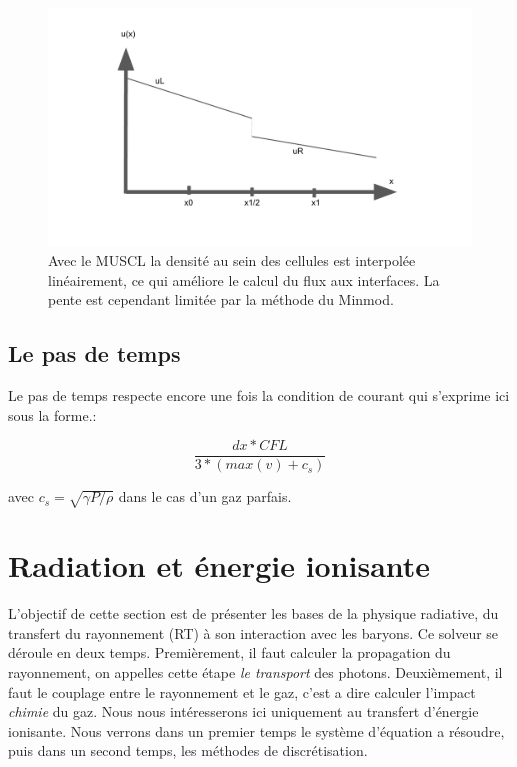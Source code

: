 \begin{figure}
        \includegraphics[width=.95\linewidth]{img/02/MUSCL_minmod.pdf} 
        \caption[Méthode MUSCL]{Avec le \ac{MUSCL} la densité au sein des cellules est interpolée linéairement, ce qui améliore le calcul du flux aux interfaces.
        La pente est cependant limitée par la méthode du Minmod.
 		\label{fig:MUSCL}
 		}
\end{figure}



\subsection{Le pas de temps}

Le pas de temps respecte encore une fois la condition de courant qui s'exprime ici sous la forme.:

\begin{equation}
\frac{dx * CFL }{3*(max(v) + c_s)}
\end{equation}

avec $c_s = \sqrt{\gamma P/\rho}$ dans le cas d'un gaz parfais.


\clearpage
\section{Radiation et énergie ionisante}
\label{sec:rad_solver}

L'objectif de cette section est de présenter les bases de la physique radiative, du transfert du rayonnement (RT) à son interaction avec les baryons.
Ce solveur se déroule en deux temps.
Premièrement, il faut calculer la propagation du rayonnement, on appelles cette étape \textit{le transport} des photons.
Deuxièmement, il faut le couplage entre le rayonnement et le gaz, c'est a dire calculer l'impact \textit{chimie} du gaz.
Nous nous intéresserons ici uniquement au transfert d'énergie ionisante.
Nous verrons dans un premier temps le système d'équation a résoudre, puis dans un second temps, les méthodes de discrétisation.

